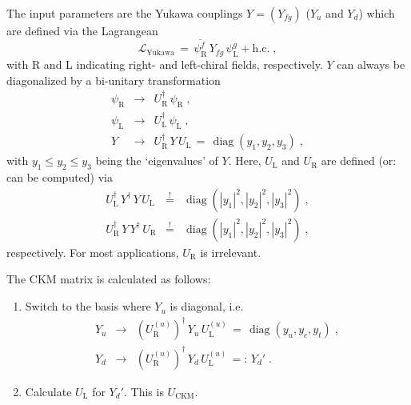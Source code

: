 \documentclass[12pt,a4paper,twoside]{scrartcl}
\DeclareMathOperator{\diag}{diag}
\numberwithin{equation}{section}
\numberwithin{table}{section}
\begin{document}
The input parameters are the Yukawa couplings $Y=(Y_{fg})$ ($Y_u$ and $Y_d$) 
which are defined via the Lagrangean
\begin{equation}
 \mathscr{L}_\mathrm{Yukawa}
 \,=\,
 \overline{\psi_\mathrm{R}^f}\,Y_{fg}\,\psi_\mathrm{L}^g
 +\text{h.c.}\;,
\end{equation}
with R and L indicating right- and left-chiral fields, respectively.  $Y$ can
always be diagonalized by a bi-unitary transformation
\begin{subequations}
\begin{eqnarray}
 \psi_\mathrm{R} & \to & U_\mathrm{R}^\dagger\,\psi_\mathrm{R}\;,\\
 \psi_\mathrm{L} & \to & U_\mathrm{L}^\dagger\,\psi_\mathrm{L}\;,\\
 Y & \to & 
 U_\mathrm{R}^\dagger\,Y\,U_\mathrm{L}
 \,=\,
 \diag(y_1,y_2,y_3)\;,
 \end{eqnarray}
\end{subequations}
with $y_1\le y_2\le y_3$ being the `eigenvalues' of $Y$. Here, $U_\mathrm{L}$
and $U_\mathrm{R}$ are defined (or: can be computed) via
\begin{subequations}
\begin{eqnarray}
 U_\mathrm{L}^\dagger\,Y^\dagger\,Y\,U_\mathrm{L}
 & \stackrel{!}{=} & 
 \diag \left(|y_1|^2,|y_2|^2,|y_3|^2\right)\;,\\
 U_\mathrm{R}^\dagger\,Y\,Y^\dagger\,U_\mathrm{R}
 & \stackrel{!}{=} & 
 \diag \left(|y_1|^2,|y_2|^2,|y_3|^2\right)\;,
\end{eqnarray}
\end{subequations}
respectively. For most applications, $U_\mathrm{R}$ is irrelevant. 

The CKM matrix is calculated as follows:
\begin{enumerate}
 \item Switch to the basis where $Y_u$ is diagonal, i.e.
 \begin{subequations}
 \begin{eqnarray}
  Y_u & \to & (U_\mathrm{R}^{(u)})^\dagger\,Y_u\,U_\mathrm{L}^{(u)}
  \,=\,\diag(y_u,y_c,y_t)\;,\\
  Y_d & \to & (U_\mathrm{R}^{(u)})^\dagger\,Y_d\,U_\mathrm{L}^{(u)}
  \,=:\, Y_d'\;.
 \end{eqnarray}
 \end{subequations}
 \item Calculate $U_\mathrm{L}$ for $Y_d'$. This is $U_\mathrm{CKM}$.
\end{enumerate}
\end{document}
